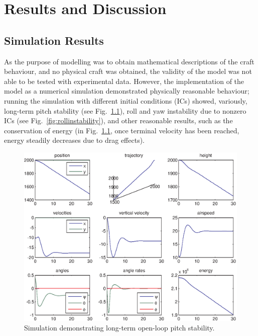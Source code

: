 \documentclass{sydeStyle}
\begin{document}
\chapter{Results and Discussion}
\label{sec:results}

\section{Simulation Results}
\label{sec:simresults}
As the purpose of modelling was to obtain mathematical descriptions of the craft
behaviour, and no physical craft was obtained, the validity of the model was not
able to be tested with experimental data.  However, the implementation of the
model as a numerical simulation demonstrated physically reasonable behaviour;
running the simulation with different initial conditions (ICs) showed,
variously, long-term pitch stability (see Fig.~\ref{fig:pitchstability}), roll
and yaw instability due to nonzero ICs (see Fig.~\ref{fig:rollinstability}), and
other reasonable results, such as the conservation of energy (in
Fig.~\ref{fig:pitchstability}, once terminal velocity has been reached, energy
steadily decreases due to drag effects).

\begin{figure}
    \begin{center}
        \includegraphics[width=0.8\columnwidth]{figs/pitchstable}
    \end{center}
    \caption{Simulation demonstrating long-term open-loop pitch stability.}
    \label{fig:pitchstability}
\end{figure}
\end{document}
